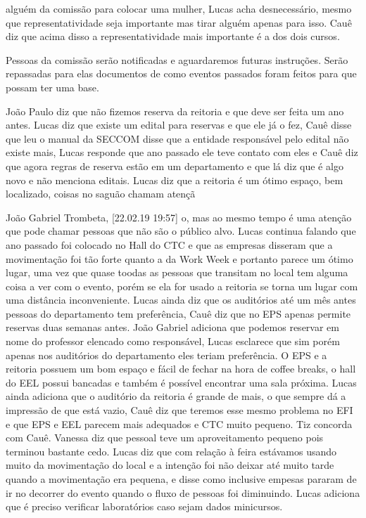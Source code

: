 \documentclass{ata-calico}
\begin{document}
alguém da comissão para colocar uma mulher, Lucas acha desnecessário, mesmo que representatividade seja importante mas tirar alguém apenas para isso. Cauê diz que acima disso a representatividade mais importante é a dos dois cursos.

Pessoas da comissão serão notificadas e aguardaremos futuras instruções. Serão repassadas para elas documentos de como eventos passados foram feitos para que possam ter uma base.

João Paulo diz que não fizemos reserva da reitoria e que deve ser feita um ano antes. Lucas diz que existe um edital para reservas e que ele já o fez, Cauê disse que leu o manual da SECCOM disse que a entidade responsável pelo edital não existe mais, Lucas responde que ano passado ele teve contato com eles e Cauê diz que agora regras de reserva estão em um departamento e que lá diz que é algo novo e não menciona editais. Lucas diz que a reitoria é um ótimo espaço, bem localizado, coisas no saguão chamam atençã

João Gabriel Trombeta, [22.02.19 19:57]
o, mas ao mesmo tempo é uma atenção que pode chamar pessoas que não são o público alvo. Lucas continua falando que ano passado foi colocado no Hall do CTC e que as empresas disseram que a movimentação foi tão forte quanto a da Work Week e portanto parece um ótimo lugar, uma vez que quase toodas as pessoas que transitam no local tem alguma coisa a ver com o evento, porém se ela for usado a reitoria se torna um lugar com uma distância inconveniente. Lucas ainda diz que os auditórios até um mês antes pessoas do departamento tem preferência, Cauê diz que no EPS apenas permite reservas duas semanas antes. João Gabriel adiciona que podemos reservar em nome do professor elencado como responsável, Lucas esclarece que sim porém apenas nos auditórios do departamento eles teriam preferência. O EPS e a reitoria possuem um bom espaço e fácil de fechar na hora de coffee breaks, o hall do EEL possui bancadas e também é possível encontrar uma sala próxima. Lucas ainda adiciona que o auditório da reitoria é grande de mais, o que sempre dá a impressão de que está vazio, Cauê diz que teremos esse mesmo problema no EFI e que EPS e EEL parecem mais adequados e CTC muito pequeno. Tiz concorda com Cauê. Vanessa diz que pessoal teve um aproveitamento pequeno pois terminou bastante cedo. Lucas diz que com relação à feira estávamos usando muito da movimentação do local e a intenção foi não deixar até muito tarde quando a movimentação era pequena, e disse como inclusive empesas pararam de ir no decorrer do evento quando o fluxo de pessoas foi diminuindo. Lucas adiciona que é preciso verificar laboratórios caso sejam dados minicursos.
\end{document}
